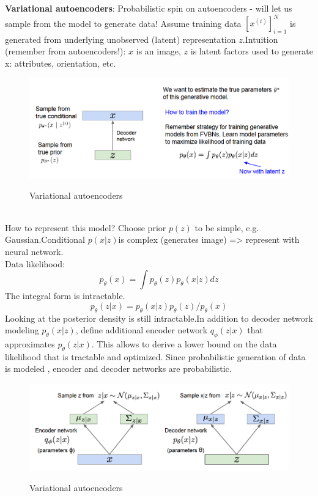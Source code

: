 \documentclass[11pt]{article}
\begin{document}
\textbf{Variational autoencoders}: Probabilistic spin on autoencoders - will let us sample from the model to generate data!
Assume training data $[x^{(i)}]_{i=1}^N$ is generated from underlying unobserved (latent) representation $z$.Intuition (remember from autoencoders!): $x$ is an image, $z $ is latent factors used to generate x: attributes, orientation, etc. 
\begin{figure}[h]
\centering
\captionsetup{justification=centering}
\includegraphics[width=0.8\linewidth]{L1218.pdf}
\label{fig:L1218}
\caption{Variational autoencoders}
\end{figure}\\
How to represent this model? Choose prior $p(z)$ to be simple, e.g. Gaussian.Conditional $p(x|z) $is complex (generates image) => represent with neural network.\\
Data likelihood:
\begin{equation}
    p_{\theta}(x)=\int     p_{\theta}(z)    p_{\theta}(x|z) dz
\end{equation}{}
The integral form is intractable.
\begin{equation}
    p_{\theta}(z|x)=   p_{\theta}(x|z) p_{\theta}(z) /p_{\theta}(x)   
\end{equation}{}
Looking at the posterior density is still intractable.In addition to decoder network modeling $p_\theta(x|z)$, define additional encoder network $q_\phi(z|x)$ that approximates $p_\theta(z|x)$.  This allows to derive a lower bound on the data likelihood that is tractable and optimized. Since  probabilistic generation of data is modeled , encoder and decoder networks are probabilistic.
\clearpage
\begin{figure}[h]
\centering
\captionsetup{justification=centering}
\includegraphics[width=0.8\linewidth]{L1219.pdf}
\label{fig:L1219}
\caption{Variational autoencoders}
\end{figure}
\end{document}
